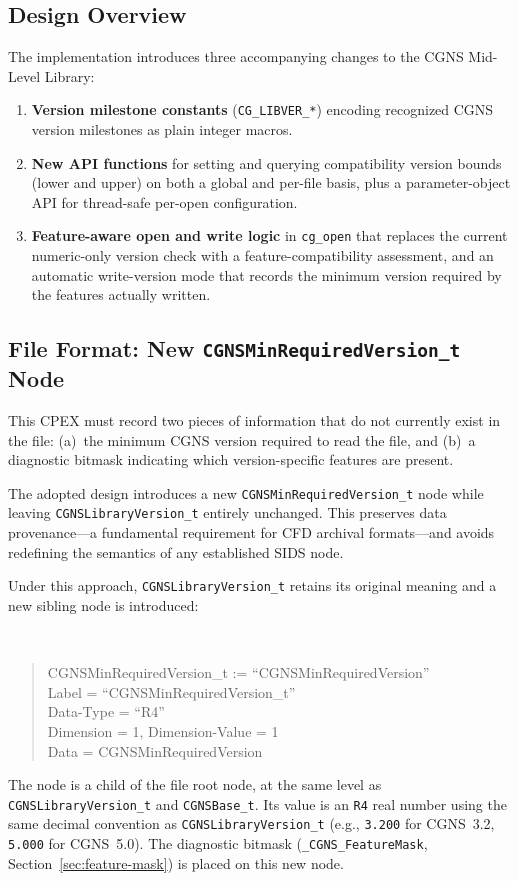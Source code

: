 \documentclass[11pt,letterpaper]{article}
\newenvironment{sidsnode}[1]{%
  \par\vspace{0.8em}%
  \noindent\colorbox{cgnslight!50}{\makebox[\dimexpr\linewidth-2\fboxsep][l]{%
    \texttt{\textbf{\color{cgnsblue}#1}}}}\\[0.3em]%
  \begin{quote}\ttfamily
}{%
  \end{quote}\vspace{0.4em}%
}
\begin{document}
\subsection{Design Overview}

The implementation introduces three accompanying changes to the CGNS
Mid-Level Library:

\begin{enumerate}[leftmargin=2em]
\item \textbf{Version milestone constants} (\texttt{CG\_LIBVER\_*})
  encoding recognized CGNS version milestones as plain integer macros.
\item \textbf{New API functions} for setting and querying
  compatibility version bounds (lower and upper) on both a global and
  per-file basis, plus a parameter-object API for thread-safe per-open
  configuration.
\item \textbf{Feature-aware open and write logic} in \texttt{cg\_open}
  that replaces the current numeric-only version check with a
  feature-compatibility assessment, and an automatic write-version
  mode that records the minimum version required by the features
  actually written.
\end{enumerate}

\subsection{File Format: New \texttt{CGNSMinRequiredVersion\_t} Node}
\label{sec:file-format-alts}
\label{sec:format-alternatives}

This CPEX must record two pieces of information that do not currently
exist in the file: (a)~the minimum CGNS version required to read the
file, and (b)~a diagnostic bitmask indicating which version-specific
features are present.

The adopted design introduces a new
\texttt{CGNSMinRequiredVersion\_t} node while leaving
\texttt{CGNSLibraryVersion\_t} entirely unchanged.  This preserves
data provenance---a fundamental requirement for CFD archival
formats---and avoids redefining the semantics of any established SIDS
node.

Under this approach, \texttt{CGNSLibraryVersion\_t} retains its
original meaning and a new sibling node is introduced:

\begin{sidsnode}{CGNSMinRequiredVersion\_t}
CGNSMinRequiredVersion\_t := ``CGNSMinRequiredVersion'' \\
  Label = ``CGNSMinRequiredVersion\_t'' \\
  Data-Type = ``R4'' \\
  Dimension = 1, Dimension-Value = 1 \\
  Data = CGNSMinRequiredVersion
\end{sidsnode}
\noindent The node is a child of the file root node, at the same level as
\texttt{CGNSLibraryVersion\_t} and \texttt{CGNSBase\_t}.  Its value
is an \texttt{R4} real number using the same decimal convention as
\texttt{CGNSLibraryVersion\_t} (e.g., \texttt{3.200} for CGNS~3.2,
\texttt{5.000} for CGNS~5.0).
The diagnostic bitmask (\texttt{\_CGNS\_FeatureMask},
Section~\ref{sec:feature-mask}) is placed on this new node.
\end{document}

